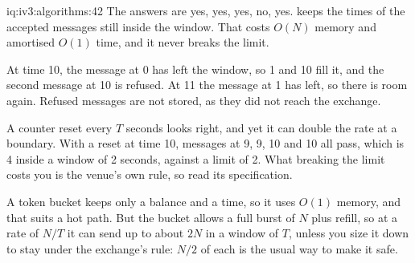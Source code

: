 \begin{solution}{iq:iv3:algorithms:42}
The answers are yes, yes, yes, no, yes.  keeps the times of the accepted messages still inside the window. That costs $O(N)$ memory and amortised $O(1)$ time, and it never breaks the limit.
\enlargethispage{-3\baselineskip}%
\label{lst:iv3:al:ratelimit}

At time 10, the message at 0 has left the window, so 1 and 10 fill it, and the second message at 10 is refused. At 11 the message at 1 has left, so there is room again. Refused messages are not stored, as they did not reach the exchange.

A counter reset every $T$ seconds looks right, and yet it can double the rate at a boundary. With a reset at time 10, messages at 9, 9, 10 and 10 all pass, which is 4 inside a window of 2 seconds, against a limit of 2. What breaking the limit costs you is the venue's own rule, so read its specification.

A token bucket keeps only a balance and a time, so it uses $O(1)$ memory, and that suits a hot path. But the bucket allows a full burst of $N$ plus refill, so at a rate of $N/T$ it can send up to about $2N$ in a window of $T$, unless you size it down to stay under the exchange's rule: $N/2$ of each is the usual way to make it safe.

\end{solution}

